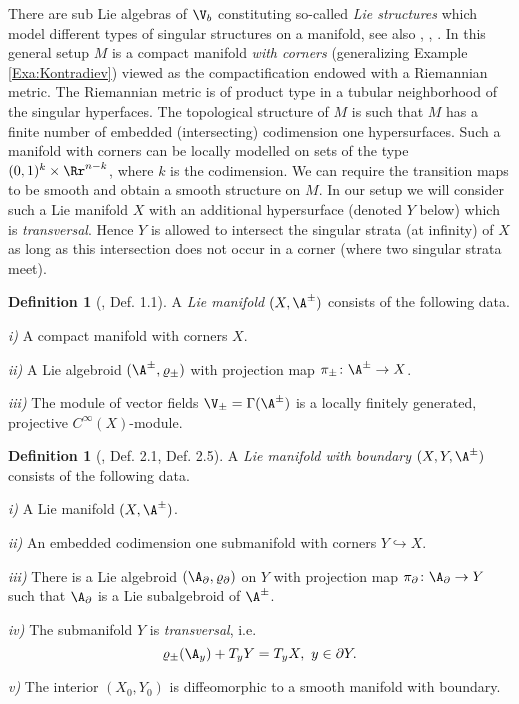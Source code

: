 \documentclass[10pt, reqno]{amsart}
\theoremstyle{definition}
\newtheorem{Def}[Thm]{Definition}
\begin{document}
There are sub Lie algebras of $\V_b$ constituting so-called \emph{Lie structures} which model different types of singular structures on a manifold, see also \cite{AIN}, \cite{ALN}, \cite{ALNV}.
In this general setup $M$ is a compact manifold \emph{with corners} (generalizing Example \ref{Exa:Kontradiev}) viewed as the compactification endowed with a Riemannian metric. 
The Riemannian metric is of product type in a tubular neighborhood of the singular hyperfaces. The topological structure of $M$ is such that $M$ has a finite number of embedded (intersecting) codimension one hypersurfaces. 
Such a manifold with corners can be locally modelled on sets of the type $(0,1)^k \times \Rr^{n-k}$, where $k$ is the codimension.
We can require the transition maps to be smooth and obtain a smooth structure on $M$. In our setup we will consider such a Lie manifold $X$ with an additional hypersurface (denoted $Y$ below) which is \emph{transversal}.
Hence $Y$ is allowed to intersect the singular strata (at infinity) of $X$ as long as this intersection does not
occur in a corner (where two singular strata meet).

\begin{Def}[\cite{ALN}, Def. 1.1]
A \emph{Lie manifold} $(X, \A^{\pm})$ consists of the following data.

\emph{i)} A compact manifold with corners $X$. 

\emph{ii)} A Lie algebroid $(\A^{\pm}, \varrho_{\pm})$ with projection map $\pi_{\pm} \colon \A^{\pm} \to X$. 

\emph{iii)} The module of vector fields $\V_{\pm} = \Gamma(\A^{\pm})$ is a locally finitely generated, projective
$C^{\infty}(X)$-module. 
\end{Def}

\begin{Def}[\cite{AIN}, Def. 2.1, Def. 2.5]
A \emph{Lie manifold with boundary} $(X, Y, \A^{\pm})$ consists of the following data.

\emph{i)} A Lie manifold $(X, \A^{\pm})$. 

\emph{ii)} An embedded codimension one submanifold with corners $Y \hookrightarrow X$. 

\emph{iii)} There is a Lie algebroid $(\A_{\partial}, \varrho_{\partial})$ on $Y$ with projection map
$\pi_{\partial} \colon \A_{\partial} \to Y$ such that $\A_{\partial}$ is a Lie subalgebroid of $\A^{\pm}$. 

\emph{iv)} The submanifold $Y$ is \emph{transversal}, i.e. 
\[
\varrho_{\pm}(\A_y) + T_y Y = T_y X, \ y \in \partial Y. 
\]

\emph{v)} The interior $(X_0, Y_0)$ is diffeomorphic to a smooth manifold with boundary. 
\end{Def}
\end{document}
